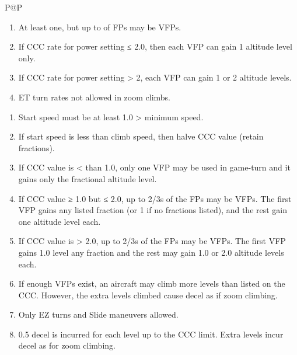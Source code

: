 \begin{twocolumntablefloat}
\begin{twocolumntable}
\begin{tabularx}{\linewidth}{P@{\hspace{1em}}P}
            \begin{enumerate}[nosep]
                \item At least one, but up to {\twothirds} of FPs may be VFPs.
                \item If CCC rate for power setting ≤ 2.0, then each VFP can gain 1 altitude level only.
                \item If CCC rate for power setting > 2, each VFP can gain 1 or 2 altitude levels.
                \item ET turn rates not allowed in zoom climbs.
            \end{enumerate}

            \begin{enumerate}[nosep]
                \item Start speed must be at least 1.0 > minimum speed.
                \item If start speed is less than climb speed, then halve CCC value (retain fractions).
                \item If CCC value is < than 1.0, only one VFP may be used in game-turn and it gains only the fractional altitude level.
                \item If CCC value ≥ 1.0 but ≤ 2.0, up to 2/3s of the FPs may be VFPs. The first VFP gains any listed fraction (or 1 if no fractions listed), and the rest gain one altitude level each.
                \item If CCC value is > 2.0, up to 2/3s of the FPs may be VFPs. The first VFP gains 1.0 level \plus{} any fraction and the rest may gain 1.0 or 2.0 altitude levels each.
                \item If enough VFPs exist, an aircraft may climb more levels than listed on the CCC. However, the extra levels climbed cause decel as if zoom climbing.
                \item Only EZ turns and Slide maneuvers allowed.
                \item 0.5 decel is incurred for each level up to the CCC limit. Extra levels incur decel as for zoom climbing.
            \end{enumerate}


\end{tabularx}
\end{twocolumntable}
\end{twocolumntablefloat}
